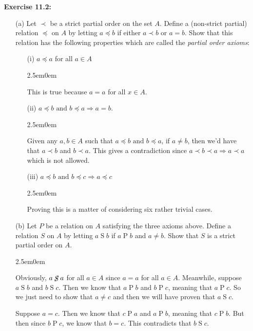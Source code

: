 \documentclass{book}
\newcommand{\exOne}{%
   \color{Purple}%
   \fontsize{14}{16}\selectfont%
}
\newcommand{\exTwo}{%
\color{Purple}%
   \fontsize{13}{15}\selectfont%
}
\newenvironment{myIndent}{%
   \begin{adjustwidth}{2.5em}{0em}%
}{%
   \end{adjustwidth}%
}
\newcommand{\blab}[1]{\textbf{#1}}
\newcommand{\retTwo}{\hfill\bigbreak}
\begin{document}
   \exOne\blab{Exercise 11.2:} 
   \begin{itemize}
      \item[(a)] Let $\prec$ be a strict partial order on the set $A$. Define a (non-strict partial) relation $\preceq$ on $A$ by letting $a \preceq b$ if either $a \prec b$ or $a = b$. Show that this relation has the following properties which are called the \textit{partial order axioms}:\newpage
      
      \begin{itemize}\exTwo
         \item[(i)] $a \preceq a$ for all $a \in A$
         \begin{myIndent}
            This is true because $a = a$ for all $x \in A$.
         \end{myIndent}

         \item[(ii)] $a \preceq b \text{ and } b \preceq a \Longrightarrow a = b$.
         \begin{myIndent}
            Given any $a, b\in A$ such that $a \preceq b \text{ and } b \preceq a$, if $a \neq b$, then we'd have that $a \prec b$ and $b \prec a$. This gives a contradiction since $a \prec b \prec a \Longrightarrow a \prec a$ which is not allowed.
         \end{myIndent}

         \item[(iii)] $a \preceq b \text{ and } b \preceq c \Longrightarrow a \preceq c$
         \begin{myIndent}
            Proving this is a matter of considering six rather trivial cases.\retTwo
         \end{myIndent}
      \end{itemize}

      \exOne\item[(b)] Let $P$ be a relation on $A$ satisfying the three axioms above. Define a relation $S$ on $A$ by letting $a\mathop{S}b$ if $a\mathop{P}b$ and $a \neq b$. Show that $S$ is a strict partial order on $A$.
      
      \begin{myIndent}\exTwo
         Obviously, $a \hspace{-0.1em}\not{\hspace{-0.24em}\mathop{S}}\hspace{0.2em} a$ for all $a \in A$ since $a = a$ for all $a \in A$. Meanwhile, suppose\\ $a \mathop{S} b$ and $b \mathop{S} c$. Then we know that $a \mathop{P} b$ and $b \mathop{P} c$, meaning that $a \mathop{P} c$. So we just need to show that $a \neq c$ and then we will have proven that $a \mathop{S} c$.

         Suppose $a = c$. Then we know that $c \mathop{P} a$ and $a \mathop{P} b$, meaning that $c \mathop{P} b$. But then since $b \mathop{P} c$, we know that $b = c$. This contradicts that $b \mathop{S} c$.
      \end{myIndent}
   \end{itemize}

   \newpage
\end{document}
